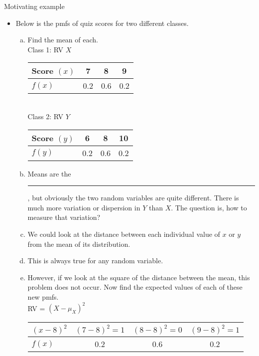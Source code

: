 \documentclass{article}
\newcommand{\blankul}[1]{\rule[-1.5mm]{#1}{0.15mm}}	%
\begin{document}
Motivating example\bigskip
\begin{itemize}
    \item Below is the pmfs of quiz scores for two different classes.
    \begin{enumerate}[(a)]
        \item Find the mean of each.\bigskip\\
        Class 1: RV $X$ \hspace{10pt}
        \begin{tabular}{| l || c | c | c |}
            \hline
            Score $(x)$ & 7 & 8 & 9 \\
            \hline
            $f(x)$ & 0.2 & 0.6 & 0.2 \\
            \hline
        \end{tabular}\bigskip\\
        Class 2: RV $Y$ \hspace{10pt}
        \begin{tabular}{| l || c | c | c |}
            \hline
            Score $(y)$ & 6 & 8 & 10 \\
            \hline
            $f(y)$ & 0.2 & 0.6 & 0.2 \\
            \hline
        \end{tabular}\vspace{80pt}
        \item[] Means are the \blankul{2cm}, but obviously the two random variables are quite different. There is much more variation or dispersion in $Y$ than $X$. The question is, how to measure that variation?
        \item We could look at the distance between each individual value of $x$ or $y$ from the mean of its distribution.\vspace{30pt}
        \item[] This is always true for any random variable.
        \item However, if we look at the square of the distance between the mean, this problem does not occur. Now find the expected values of each of these new pmfs.\bigskip\\
        RV = $(X - \mu_X)^2$ \hspace{10pt}
\begin{tabular}{| l || c | c | c |}
            \hline
             $(x - 8)^2$ & $(7 - 8)^2 = 1$ & $(8 - 8)^2 = 0$ & $(9 - 8)^2 = 1$ \\
            \hline
            $f(x)$ & 0.2 & 0.6 & 0.2 \\
            \hline

\end{tabular}
\end{enumerate}
\end{itemize}
\end{document}
